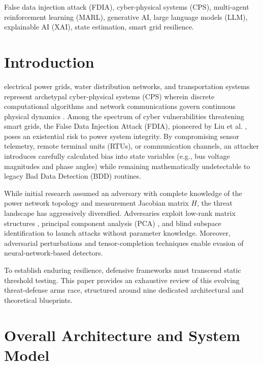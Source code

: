 \documentclass[journal,compsoc]{IEEEtran}
\begin{document}
\begin{IEEEkeywords}
False data injection attack (FDIA), cyber-physical systems (CPS), multi-agent reinforcement learning (MARL), generative AI, large language models (LLM), explainable AI (XAI), state estimation, smart grid resilience.
\end{IEEEkeywords}

\section{Introduction}
 electrical power grids, water distribution networks, and transportation systems represent archetypal cyber-physical systems (CPS) wherein discrete computational algorithms and network communications govern continuous physical dynamics \cite{ref1, ref5}. Among the spectrum of cyber vulnerabilities threatening smart grids, the False Data Injection Attack (FDIA), pioneered by Liu et al. \cite{ref29}, poses an existential risk to power system integrity. By compromising sensor telemetry, remote terminal units (RTUs), or communication channels, an attacker introduces carefully calculated bias into state variables (e.g., bus voltage magnitudes and phase angles) while remaining mathematically undetectable to legacy Bad Data Detection (BDD) routines.

While initial research assumed an adversary with complete knowledge of the power network topology and measurement Jacobian matrix $H$, the threat landscape has aggressively diversified. Adversaries exploit low-rank matrix structures \cite{ref48}, principal component analysis (PCA) \cite{ref56}, and blind subspace identification \cite{ref41} to launch attacks without parameter knowledge. Moreover, adversarial perturbations \cite{ref35, ref75} and tensor-completion techniques \cite{ref59} enable evasion of neural-network-based detectors.

To establish enduring resilience, defensive frameworks must transcend static threshold testing. This paper provides an exhaustive review of this evolving threat-defense arms race, structured around nine dedicated architectural and theoretical blueprints.

\section{Overall Architecture and System Model}
\end{document}
